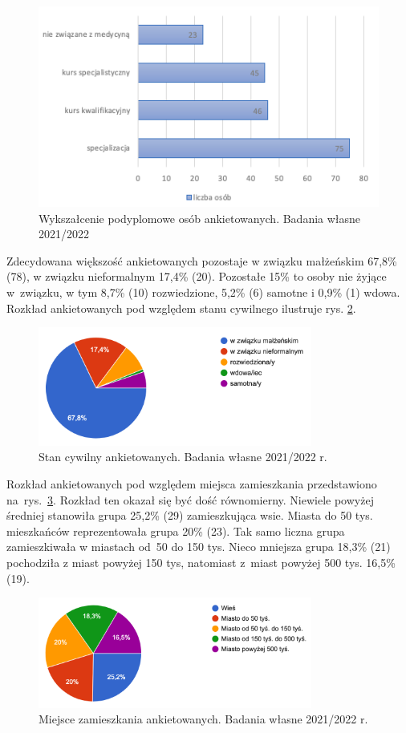 \documentclass[a4paper,12pt,twoside,openright]{mwrep}
\begin{document}
\begin{figure}[H]
\centering
\includegraphics[width=13cm]{char_gr_bad/podyplom01}
\caption{Wykszałcenie podyplomowe osób ankietowanych. Badania własne 2021/2022}
\label{rys:podyplom}
\end{figure}


Zdecydowana większość ankietowanych pozostaje w związku małżeńskim 67,8\%  (78), w związku nieformalnym 17,4\% (20). Pozostałe 15\% to osoby nie żyjące w~związku, w tym  8,7\% (10) rozwiedzione,  5,2\% (6) samotne i 0,9\%  (1) wdowa. Rozkład ankietowanych pod względem stanu cywilnego ilustruje rys. \ref{rys:cywil}.

\begin{figure}[H]
\centering
\includegraphics[width=9cm]{char_gr_bad/cyw00}
\caption{Stan cywilny ankietowanych. Badania własne 2021/2022 r.}
\label{rys:cywil}
\end{figure}


Rozkład ankietowanych pod względem miejsca zamieszkania przedstawiono na~rys.~\ref{rys:zamiesz}. Rozkład ten okazał się być dość równomierny. Niewiele powyżej średniej stanowiła grupa 25,2\% (29) zamieszkująca  wsie. Miasta do 50 tys. mieszkańców reprezentowała grupa  20\%  (23). Tak samo liczna grupa zamieszkiwała w miastach od~50 do 150 tys. Nieco mniejsza grupa  18,3\% (21) pochodziła z miast powyżej 150 tys, natomiast z~miast powyżej 500 tys. 16,5\% (19).
\begin{figure}[H]
\centering
\includegraphics[width=9cm]{char_gr_bad/zamieszka00}
\caption{Miejsce zamieszkania ankietowanych. Badania własne 2021/2022 r.}
\label{rys:zamiesz}
\end{figure}
\end{document}
